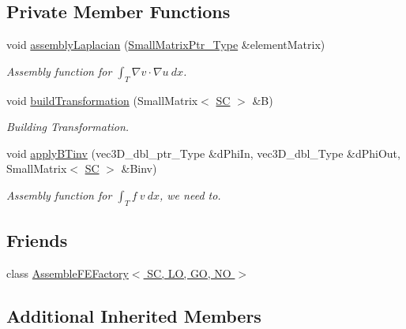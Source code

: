 \subsection*{Private Member Functions}
\begin{DoxyCompactItemize}
\item 
void \hyperlink{classFEDD_1_1AssembleFEAceLaplace_a0899c869aa01d6a2730b2d5c6d70af22}{assembly\+Laplacian} (\hyperlink{classFEDD_1_1AssembleFE_afb5fb5dca3aab59f697a25884e99e894}{Small\+Matrix\+Ptr\+\_\+\+Type} \&element\+Matrix)
\begin{DoxyCompactList}\small\item\em Assembly function for $ \int_T \nabla v \cdot \nabla u ~dx$. \end{DoxyCompactList}\item 
void \hyperlink{classFEDD_1_1AssembleFEAceLaplace_a2ae9570305a7f3aaa597e5b8874e4613}{build\+Transformation} (Small\+Matrix$<$ \hyperlink{fe__test__laplace_8cpp_a79c7e86a57edbb2a5a53242bcd04e41e}{SC} $>$ \&B)
\begin{DoxyCompactList}\small\item\em Building Transformation. \end{DoxyCompactList}\item 
void \hyperlink{classFEDD_1_1AssembleFEAceLaplace_ab6836244e87f6f0ee28b6f611ec27717}{apply\+B\+Tinv} (vec3\+D\+\_\+dbl\+\_\+ptr\+\_\+\+Type \&d\+Phi\+In, vec3\+D\+\_\+dbl\+\_\+\+Type \&d\+Phi\+Out, Small\+Matrix$<$ \hyperlink{fe__test__laplace_8cpp_a79c7e86a57edbb2a5a53242bcd04e41e}{SC} $>$ \&Binv)
\begin{DoxyCompactList}\small\item\em Assembly function for $ \int_T f ~ v ~dx $, we need to. \end{DoxyCompactList}\end{DoxyCompactItemize}
\subsection*{Friends}
\begin{DoxyCompactItemize}
\item 
class \hyperlink{classFEDD_1_1AssembleFEAceLaplace_a30ff0dcd1d500892033fc319deacb8fb}{Assemble\+F\+E\+Factory$<$ S\+C, L\+O, G\+O, N\+O $>$}
\end{DoxyCompactItemize}
\subsection*{Additional Inherited Members}



